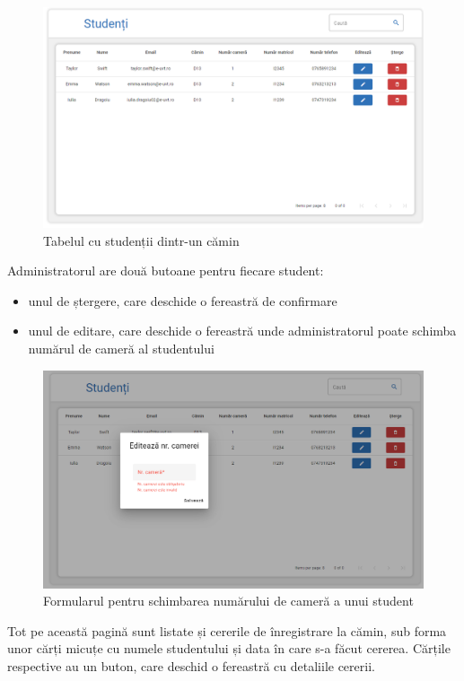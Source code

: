\documentclass[12pt,a4paper]{report}
\theoremstyle{definition}
\theoremstyle{remark}
\begin{document}
\begin{figure}[H]
    \centering
    \includegraphics[width=0.8\linewidth]{resurse/ghid_utilizare/studenti.png}
    \caption{Tabelul cu studenții dintr-un cămin}
\end{figure}

\par Administratorul are două butoane pentru fiecare student:

\begin{itemize}
    \item unul de ștergere, care deschide o fereastră de confirmare
    \item unul de editare, care deschide o fereastră unde administratorul poate schimba numărul de cameră al studentului
\end{itemize}

\begin{figure}[H]
    \centering
    \includegraphics[width=0.8\linewidth]{resurse/ghid_utilizare/editare_nr_camea.png}
    \caption{Formularul pentru schimbarea numărului de cameră a unui student}
\end{figure}

\par Tot pe această pagină sunt listate și cererile de înregistrare la cămin, sub forma unor cărți micuțe cu numele studentului și data în care s-a făcut cererea. Cărțile respective au un buton, care deschid o fereastră cu detaliile cererii.
\end{document}
